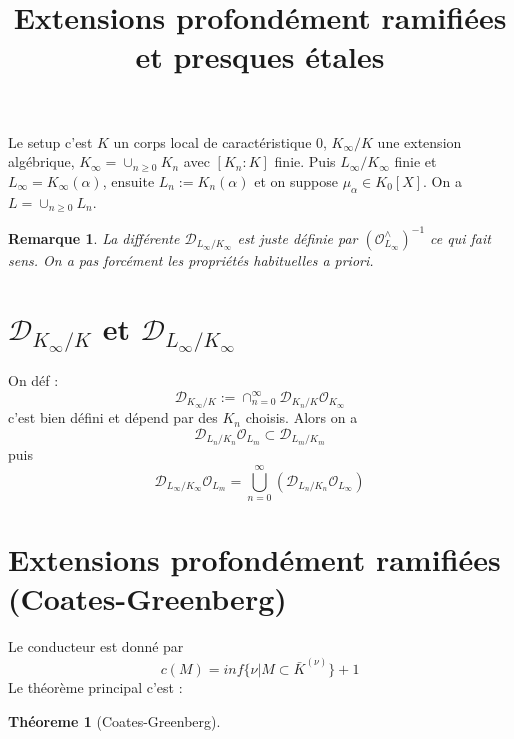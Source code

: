 \documentclass[a4paper,12pt]{article}
\title{Extensions profondément ramifiées et presques étales}
\date{}
\newcommand{\Or}{\mathcal{O}}
\newcommand{\D}{\mathscr{D}}
\theoremstyle{plain}
\newtheorem{thm}{Théoreme}
\newtheorem{rem}{Remarque}
\theoremstyle{definition}
\theoremstyle{remark}
\begin{document}
\maketitle

Le setup c'est $K$ un corps local de caractéristique $0$,
$K_\infty/K$ une extension algébrique, $K_\infty=\cup_{n\geq 0} K_n$
avec $[K_n:K]$ finie. Puis $L_\infty/K_\infty$ finie et $L_\infty=K_\infty(\alpha)$,
ensuite $L_n:=K_n(\alpha)$ et on suppose
$\mu_\alpha\in K_{0}[X]$. On a $L=\cup_{n\geq 0} L_n$.

\begin{rem}
  La différente $\D_{L_\infty/K_\infty}$ est juste
  définie par $(\Or_{L_\infty}^\wedge)^{-1}$ ce qui 
  fait sens. On a pas forcément les propriétés 
  habituelles a priori.
\end{rem}

\section{$\D_{K_\infty/K}$ et $\D_{L_\infty/K_\infty}$}
On déf :
\[\D_{K_\infty/K}:=\cap_{n=0}^\infty \D_{K_n/K}\Or_{K_\infty}\]
c'est bien défini et dépend par des $K_n$ choisis. Alors
on a 
\[\D_{L_n/K_n}\Or_{L_m}\subset \D_{L_m/K_m}\]
puis
\[\D_{L_\infty/K_\infty}\Or_{L_m}=\bigcup_{n=0}^\infty(\D_{L_n/K_n}\Or_{L_\infty})\]



\section{Extensions profondément ramifiées (Coates-Greenberg)}
Le conducteur est donné par 
\[c(M)=inf\{\nu|M\subset \bar K^{(\nu)}\}+1\]
Le théorème principal c'est :
\begin{thm}[Coates-Greenberg]


\end{thm}
\end{document}
